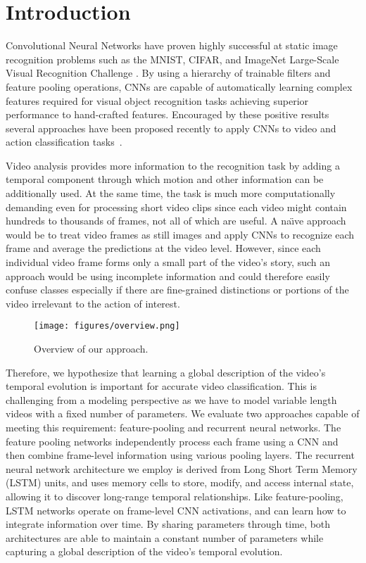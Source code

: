 \documentclass[10pt,twocolumn,letterpaper]{article}
\begin{document}
\section{Introduction}\label{sec:intro}

Convolutional Neural Networks have proven highly successful at static
image recognition problems such as the MNIST, CIFAR, and ImageNet
Large-Scale Visual Recognition Challenge \cite{krizhevsky2012imagenet,
  szegedy14going, zeiler13visualizing}. By using a hierarchy of trainable filters
and feature pooling operations, CNNs are capable of automatically learning
complex features required for visual object recognition tasks
achieving superior performance to hand-crafted features. Encouraged by these positive results
several approaches have been proposed recently to apply CNNs to video and action
classification tasks~\cite{liris2011,ji2013,karpathy2014large,simonyan2014two}.


Video analysis provides more information to the recognition task by
adding a temporal component through which motion and other information
can be additionally used. At the same time, the task is much more
computationally demanding even for processing short video clips since
each video might contain hundreds to thousands of frames, not all of
which are useful. A na\"{\i}ve approach would be to treat video frames
as still images and apply CNNs to recognize each frame and average %
the predictions at the video level. However, since each individual
video frame forms only a small part of the video's story, such an
approach would be using incomplete information and could therefore
easily confuse classes especially if there are fine-grained
distinctions or portions of the video irrelevant to the action of
interest.

\begin{figure}
\begin{center}
  \texttt{[image: figures/overview.png]}
  \caption{Overview of our approach.}
\end{center}
\end{figure}

Therefore, we hypothesize that learning a global description of the
video's temporal evolution is important for accurate video
classification. This is challenging from a modeling perspective as we
have to model variable length videos with a fixed number of
parameters.  We evaluate two approaches capable of meeting this
requirement: feature-pooling and recurrent neural networks. The
feature pooling networks independently process each frame using a CNN
and then combine frame-level information using various pooling
layers. The recurrent neural network architecture we employ is derived
from Long Short Term Memory (LSTM) \cite{hochreiter97long} units, and
uses memory cells to store, modify, and access internal state,
allowing it to discover long-range temporal relationships. Like
feature-pooling, LSTM networks operate on frame-level CNN activations,
and can learn how to integrate information over time. By sharing
parameters through time, both architectures are able to maintain a
constant number of parameters while capturing a global description of
the video's temporal evolution.
\end{document}

